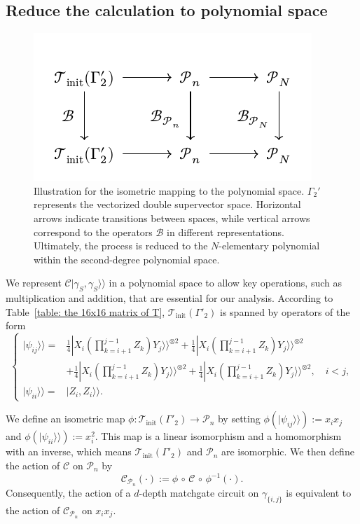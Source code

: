 \documentclass[showpacs,onecolumn,aps,prx,long bibliography,superscriptaddress,notitlepage]{revtex4-1}
\newcommand{\supket}[1]{|#1 \rangle\rangle}
\newcommand{\Tcal}{\mathcal{T}}
\begin{document}
\subsection{Reduce the calculation to polynomial space}
\begin{figure}
    \centering
    \includegraphics[width=0.6\linewidth]{figures/appendix/commute_diagram.pdf}
    \caption{\centering Illustration for the isometric mapping to the polynomial space. $\Gamma_2'$ represents the vectorized double supervector space. Horizontal arrows indicate transitions between spaces, while vertical arrows correspond to the operators $\mathcal{B}$ in different representations. Ultimately, the process is reduced to the $N$-elementary polynomial within the second-degree polynomial space.}
    \label{diagram: commute diagram}
\end{figure}




We represent \(\mathcal{C} \supket{\gamma_S, \gamma_S}\) in a polynomial space to allow key operations, such as multiplication and addition, that are essential for our analysis. According to Table~\ref{table: the 16x16 matrix of T}, \(\Tcal_\text{init}(\Gamma'_2)\) is spanned by operators of the form
\begin{equation}
    \begin{cases}
    \supket{\psi_{ij}} =& \frac{1}{4}\supket{X_i \left(\displaystyle\prod_{k = i+1}^{j-1} Z_k\right)Y_j}^{\otimes 2}
    + \frac{1}{4}\supket{X_i \left(\displaystyle\prod_{k = i+1}^{j-1} Z_k\right)Y_j}^{\otimes 2} \\
    & + \frac{1}{4}\supket{X_i \left(\displaystyle\prod_{k = i+1}^{j-1} Z_k\right)Y_j}^{\otimes 2}
    + \frac{1}{4}\supket{X_i \left(\displaystyle\prod_{k = i+1}^{j-1} Z_k\right)Y_j}^{\otimes 2}, \quad i<j, \\[6pt]
    \supket{\psi_{ii}} =& \supket{Z_i, Z_i}.
\end{cases}
\end{equation}

We define an isometric map \(\phi: \Tcal_\text{init}(\Gamma'_2) \to \mathcal{P}_n\) by setting \(\phi(\supket{\psi_{ij}}) := x_i x_j\) and \(\phi(\supket{\psi_{ii}}) := x_i^2\). This map is a linear isomorphism and a homomorphism with an inverse, which means \(\Tcal_\text{init}(\Gamma'_2)\) and \(\mathcal{P}_n\) are isomorphic. We then define the action of \(\mathcal{C}\) on \(\mathcal{P}_n\) by
\begin{equation}
    \mathcal{C}_{\mathcal{P}_n}(\cdot) := \phi \,\circ\, \mathcal{C} \,\circ\, \phi^{-1} (\cdot).
\end{equation}
Consequently, the action of a \(d\)-depth matchgate circuit on \(\gamma_{\{i,j\}}\) is equivalent to the action of \(\mathcal{C}_{\mathcal{P}_n}\) on \(x_i x_j\).
\end{document}
